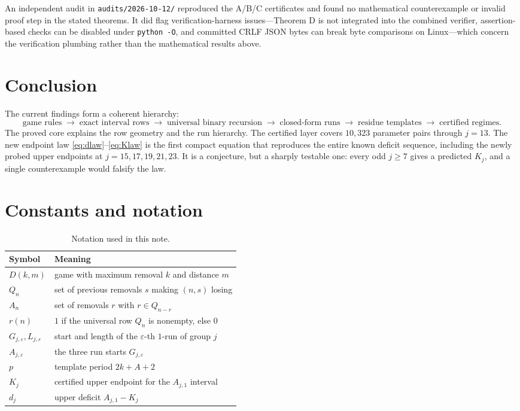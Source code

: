 \documentclass[11pt]{article}
\theoremstyle{remark}
\begin{document}
An independent audit in \texttt{audits/2026-10-12/} reproduced the A/B/C certificates and found no mathematical counterexample or invalid proof step in the stated theorems. It did flag verification-harness issues---Theorem D is not integrated into the combined verifier, assertion-based checks can be disabled under \texttt{python -O}, and committed CRLF JSON bytes can break byte comparisons on Linux---which concern the verification plumbing rather than the mathematical results above.

\section{Conclusion}

The current findings form a coherent hierarchy:
\[
\text{game rules}
\;\longrightarrow\;
\text{exact interval rows}
\;\longrightarrow\;
\text{universal binary recursion}
\;\longrightarrow\;
\text{closed-form runs}
\;\longrightarrow\;
\text{residue templates}
\;\longrightarrow\;
\text{certified regimes}.
\]
The proved core explains the row geometry and the run hierarchy. The certified layer covers \(10{,}323\) parameter pairs through \(j=13\). The new endpoint law \eqref{eq:dlaw}--\eqref{eq:Klaw} is the first compact equation that reproduces the entire known deficit sequence, including the newly probed upper endpoints at \(j=15,17,19,21,23\). It is a conjecture, but a sharply testable one: every odd \(j\ge7\) gives a predicted \(K_j\), and a single counterexample would falsify the law.

\appendix

\section{Constants and notation}

\begin{table}[h]
\centering
\small
\caption{Notation used in this note.}
\begin{tabular}{ll}
\toprule
Symbol & Meaning\\
\midrule
\(D(k,m)\) & game with maximum removal \(k\) and distance \(m\)\\
\(Q_n\) & set of previous removals \(s\) making \((n,s)\) losing\\
\(A_n\) & set of removals \(r\) with \(r\in Q_{n-r}\)\\
\(r(n)\) & \(1\) if the universal row \(Q_n\) is nonempty, else \(0\)\\
\(G_{j,\varepsilon},L_{j,\varepsilon}\) & start and length of the \(\varepsilon\)-th \(1\)-run of group \(j\)\\
\(A_{j,\varepsilon}\) & the three run starts \(G_{j,\varepsilon}\)\\
\(p\) & template period \(2k+A+2\)\\
\(K_j\) & certified upper endpoint for the \(A_{j,1}\) interval\\
\(d_j\) & upper deficit \(A_{j,1}-K_j\)\\
\bottomrule
\end{tabular}
\end{table}
\end{document}
